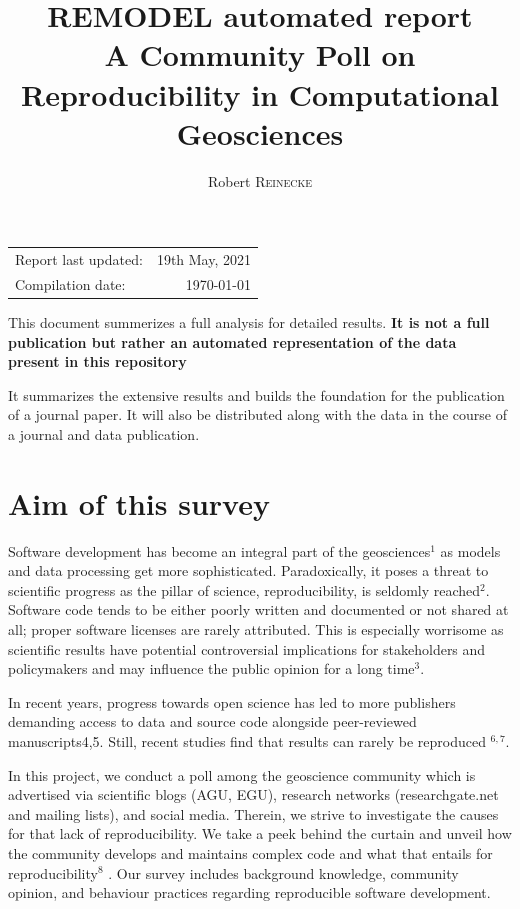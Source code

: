 \documentclass{article}
\title{\textbf{REMODEL automated report} \\ A Community Poll on Reproducibility in Computational Geosciences} %
\author{Robert \textsc{Reinecke}} %
\begin{document}
\maketitle %

\begin{center}
\begin{tabular}{l r}
Report last updated: & 19th May, 2021\\
Compilation date: & \today
\end{tabular}
\end{center}

This document summerizes a full analysis for detailed results. \textbf{It is not a full publication but rather an automated representation of the data present in this repository}

It summarizes the extensive results and builds the foundation for the publication of a journal paper.
It will also be distributed along with the data in the course of a journal and data publication.

\section{Aim of this survey}
Software development has become an integral part of the geosciences$^{1}$ as models and data processing get more sophisticated.
Paradoxically, it poses a threat to scientific progress as the pillar of science, reproducibility, is seldomly reached$^{2}$.
Software code tends to be either poorly written and documented or not shared at all; proper software licenses are rarely attributed.
This is especially worrisome as scientific results have potential controversial implications for stakeholders and policymakers and may influence the public opinion for a long time$^{3}$.

In recent years, progress towards open science has led to more publishers demanding access to data and source code alongside peer-reviewed manuscripts4,5. Still, recent studies find that results can rarely be reproduced $^{6,7}$.

In this project, we conduct a poll among the geoscience community which is advertised via scientific blogs (AGU, EGU), research networks (researchgate.net and mailing lists), and social media.
Therein, we strive to investigate the causes for that lack of reproducibility.
We take a peek behind the curtain and unveil how the community develops and maintains complex code and what that entails for reproducibility$^{8}$ .
Our survey includes background knowledge, community opinion, and behaviour practices regarding reproducible software development.
\end{document}
